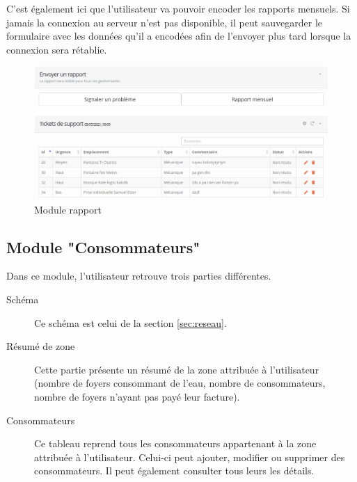 \documentclass{EPL-master-thesis-covers-FR}
\begin{document}
				C'est également ici que l'utilisateur va pouvoir encoder les rapports mensuels. Si jamais la connexion au serveur n'est pas disponible, il peut sauvegarder le formulaire avec les données qu'il a encodées afin de l'envoyer plus tard lorsque la connexion sera rétablie.
				
				\begin{figure}[H]
					\centering
					\includegraphics[width=1\textwidth]{images/report}
					\caption{Module rapport}
				\end{figure}
			
			
			\subsection{Module "Consommateurs"}
				Dans ce module, l'utilisateur retrouve trois parties différentes.
				\begin{description}
					\item[Schéma] Ce schéma est celui de la section \ref{sec:reseau}.
					\item[Résumé de zone] Cette partie présente un résumé de la zone attribuée à l'utilisateur (nombre de foyers consommant de l'eau, nombre de consommateurs, nombre de foyers n'ayant pas payé leur facture).
					\item[Consommateurs] Ce tableau reprend tous les consommateurs appartenant à la zone attribuée à l'utilisateur. Celui-ci peut ajouter, modifier ou supprimer des consommateurs. Il peut également consulter tous leurs les détails.
				\end{description}

				
				
\end{document}
